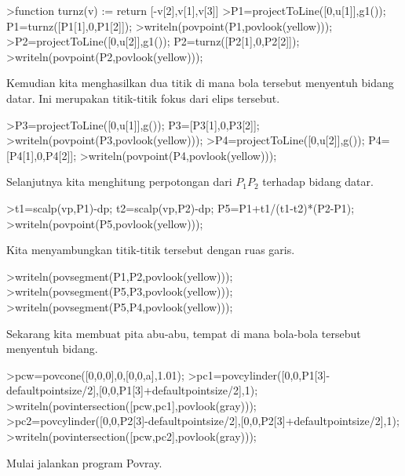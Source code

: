 \documentclass[a4paper,11pt,oneside,enabledeprecatedfontcommands]{scrbook}
\newenvironment{eulernotebook}{}{}
\newenvironment{eulercomment}{\par\medskip\noindent}{\par\medskip}
\begin{document}
\begin{eulernotebook}
\begin{eulerprompt}
>function turnz(v) := return [-v[2],v[1],v[3]]
>P1=projectToLine([0,u[1]],g1()); P1=turnz([P1[1],0,P1[2]]);
>writeln(povpoint(P1,povlook(yellow)));
>P2=projectToLine([0,u[2]],g1()); P2=turnz([P2[1],0,P2[2]]);
>writeln(povpoint(P2,povlook(yellow)));
\end{eulerprompt}
\begin{eulercomment}
Kemudian kita menghasilkan dua titik di mana bola tersebut menyentuh bidang datar. Ini merupakan
titik-titik fokus dari elips tersebut.
\end{eulercomment}
\begin{eulerprompt}
>P3=projectToLine([0,u[1]],g()); P3=[P3[1],0,P3[2]];
>writeln(povpoint(P3,povlook(yellow)));
>P4=projectToLine([0,u[2]],g()); P4=[P4[1],0,P4[2]];
>writeln(povpoint(P4,povlook(yellow)));
\end{eulerprompt}
\begin{eulercomment}
Selanjutnya kita menghitung perpotongan dari $P_1 P_2$ terhadap bidang datar.
\end{eulercomment}
\begin{eulerprompt}
>t1=scalp(vp,P1)-dp; t2=scalp(vp,P2)-dp; P5=P1+t1/(t1-t2)*(P2-P1);
>writeln(povpoint(P5,povlook(yellow)));
\end{eulerprompt}
\begin{eulercomment}
Kita menyambungkan titik-titik tersebut dengan ruas garis.
\end{eulercomment}
\begin{eulerprompt}
>writeln(povsegment(P1,P2,povlook(yellow)));
>writeln(povsegment(P5,P3,povlook(yellow)));
>writeln(povsegment(P5,P4,povlook(yellow)));
\end{eulerprompt}
\begin{eulercomment}
Sekarang kita membuat pita abu-abu, tempat di mana bola-bola tersebut menyentuh bidang.
\end{eulercomment}
\begin{eulerprompt}
>pcw=povcone([0,0,0],0,[0,0,a],1.01);
>pc1=povcylinder([0,0,P1[3]-defaultpointsize/2],[0,0,P1[3]+defaultpointsize/2],1);
>writeln(povintersection([pcw,pc1],povlook(gray)));
>pc2=povcylinder([0,0,P2[3]-defaultpointsize/2],[0,0,P2[3]+defaultpointsize/2],1);
>writeln(povintersection([pcw,pc2],povlook(gray)));
\end{eulerprompt}
\begin{eulercomment}
Mulai jalankan program Povray.
\end{eulercomment}
\begin{eulerprompt}

\end{eulerprompt}
\end{eulernotebook}
\end{document}
